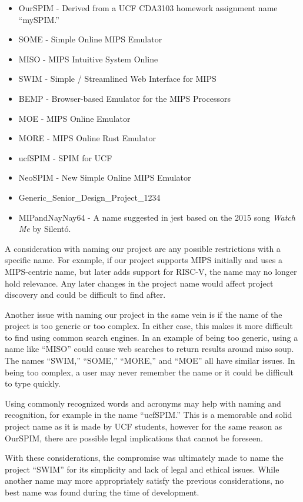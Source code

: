 \documentclass[
    paper=letter,
    parskip=half,
    fontsize=12pt,
    titlepage=firstiscover,
    toc=bibliography,
    numbers=endperiod
]{scrartcl}
\providecommand{\tightlist}{%
  \setlength{\itemsep}{0pt}\setlength{\parskip}{0pt}}
\begin{document}
\begin{itemize}
    \tightlist
    \item OurSPIM - Derived from a UCF CDA3103 homework assignment name ``mySPIM.''
    \item SOME - Simple Online MIPS Emulator
    \item MISO - MIPS Intuitive System Online
    \item SWIM - Simple / Streamlined Web Interface for MIPS
    \item BEMP - Browser-based Emulator for the MIPS Processors
    \item MOE - MIPS Online Emulator
    \item MORE - MIPS Online Rust Emulator
    \item ucfSPIM - SPIM for UCF
    \item NeoSPIM - New Simple Online MIPS Emulator
    \item Generic\_Senior\_Design\_Project\_1234
    \item MIPandNayNay64 - A name suggested in jest based on the 2015 song \emph{Watch Me} by Silent\'o.
\end{itemize}

A consideration with naming our project are any possible restrictions
with a specific name. For example, if our project supports MIPS
initially and uses a MIPS-centric name, but later adds support for
RISC-V, the name may no longer hold relevance. Any later changes in the
project name would affect project discovery and could be difficult to
find after.

Another issue with naming our project in the same vein is if the name of
the project is too generic or too complex. In either case, this makes it
more difficult to find using common search engines. In an example of
being too generic, using a name like ``MISO'' could cause web searches
to return results around miso soup. The names ``SWIM,'' ``SOME,''
``MORE,'' and ``MOE'' all have similar issues. In being too complex, a
user may never remember the name or it could be difficult to type quickly.

Using commonly recognized words and acronyms may help with naming and
recognition, for example in the name ``ucfSPIM.'' This is a memorable
and solid project name as it is made by UCF students, however for the
same reason as OurSPIM, there are possible legal implications that
cannot be foreseen.

With these considerations, the compromise was ultimately made to name
the project ``SWIM'' for its simplicity and lack of legal and ethical
issues. While another name may more appropriately satisfy the previous
considerations, no best name was found during the time of development.
\end{document}
